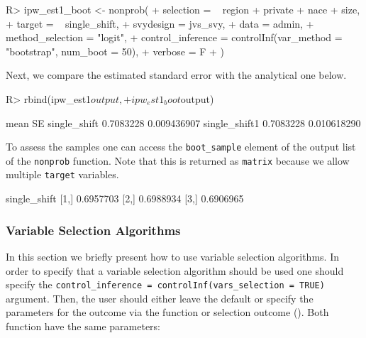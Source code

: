 \documentclass[
]{jss}
\begin{document}
\begin{CodeChunk}
\begin{CodeInput}
R> ipw_est1_boot <- nonprob(
+   selection = ~ region + private + nace + size,
+   target = ~ single_shift,
+   svydesign = jvs_svy,
+   data = admin,
+   method_selection = "logit",
+   control_inference = controlInf(var_method = "bootstrap", num_boot = 50),
+   verbose = F
+ )
\end{CodeInput}
\end{CodeChunk}

Next, we compare the estimated standard error with the analytical one
below.

\begin{CodeChunk}
\begin{CodeInput}
R> rbind(ipw_est1$output,
+       ipw_est1_boot$output)
\end{CodeInput}
\begin{CodeOutput}
                   mean          SE
single_shift  0.7083228 0.009436907
single_shift1 0.7083228 0.010618290
\end{CodeOutput}
\end{CodeChunk}

To assess the samples one can access the \texttt{boot\_sample} element
of the output list of the \texttt{nonprob} function. Note that this is
returned as \texttt{matrix} because we allow multiple \texttt{target}
variables.

\begin{CodeChunk}
\begin{CodeOutput}
     single_shift
[1,]    0.6957703
[2,]    0.6988934
[3,]    0.6906965
\end{CodeOutput}
\end{CodeChunk}

\subsubsection{Variable Selection
Algorithms}\label{variable-selection-algorithms}

In this section we briefly present how to use variable selection
algorithms. In order to specify that a variable selection algorithm
should be used one should specify the
\texttt{control\_inference\ =\ controlInf(vars\_selection\ =\ TRUE)}
argument. Then, the user should either leave the default or specify the
parameters for the outcome via the  function or
selection outcome (). Both function have the same
parameters:
\end{document}
